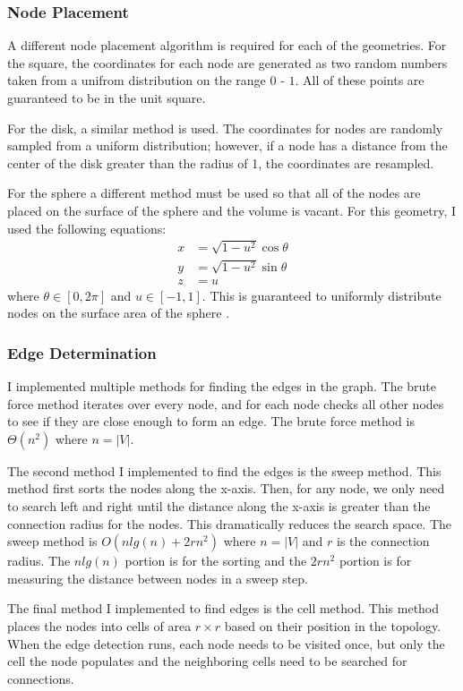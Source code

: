 \documentclass{article}
\begin{document}
        \subsubsection{Node Placement}
        A different node placement algorithm is required for each of the geometries. For the square, the coordinates for each node are generated as two random numbers taken from a unifrom distribution on the range $0$ - $1$. All of these points are guaranteed to be in the unit square.
        \par
        For the disk, a similar method is used. The coordinates for nodes are randomly sampled from a uniform distribution; however, if a node has a distance from the center of the disk greater than the radius of 1, the coordinates are resampled.
        \par
        For the sphere a different method must be used so that all of the nodes are placed on the surface of the sphere and the volume is vacant. For this geometry, I used the following equations:
        \begin{align}
            x &= \sqrt{1-u^2}\cos\theta \\
            y &= \sqrt{1-u^2}\sin\theta \\
            z &= u
        \end{align}
        where $\theta \in [0,2\pi]$ and $u \in [-1,1]$. This is guaranteed to uniformly distribute nodes on the surface area of the sphere \cite{spherepoints}.

        \subsubsection{Edge Determination}
        I implemented multiple methods for finding the edges in the graph. The brute force method iterates over every node, and for each node checks all other nodes to see if they are close enough to form an edge. The brute force method is $\Theta\left(n^2\right)$ where $n = |V|$.
        \par
        The second method I implemented to find the edges is the sweep method. This method first sorts the nodes along the x-axis. Then, for any node, we only need to search left and right until the distance along the x-axis is greater than the connection radius for the nodes. This dramatically reduces the search space. The sweep method is $O\left(n lg(n) + 2rn^2\right)$ where $n = |V|$ and $r$ is the connection radius. The $n lg(n)$ portion is for the sorting and the $2rn^2$ portion is for measuring the distance between nodes in a sweep step.
        \par
        The final method I implemented to find edges is the cell method. This method places the nodes into cells of area $r \times r$ based on their position in the topology. When the edge detection runs, each node needs to be visited once, but only the cell the node populates and the neighboring cells need to be searched for connections.
\end{document}
